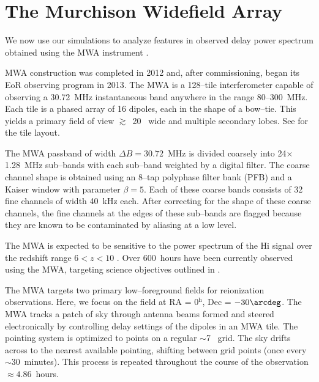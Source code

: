 \documentclass[preprint2,iop,numberedappendix,twocolappendix,appendixfloats]{emulateapj}
\begin{document}
\section{The Murchison Widefield Array}\label{sec:MWA}

We now use our simulations to analyze features in observed delay power spectrum obtained using the MWA instrument \citep{lon09,tin13}.


MWA construction was completed in 2012 and, after commissioning, began its EoR observing program in 2013. The MWA is a 128--tile interferometer capable of observing a 30.72~MHz instantaneous band anywhere in the range 80--300~MHz. Each tile is a phased array of 16 dipoles, each in the shape of a bow--tie. This yields a primary field of view $\gtrsim$~20\arcdeg~ wide and multiple secondary lobes. See \citet{bea12} for the tile layout. %

The MWA passband of width $\Delta B=30.72$~MHz is divided coarsely into 24$\times$1.28~MHz sub--bands with each sub--band weighted by a digital filter. The coarse channel shape is obtained using an 8--tap polyphase filter bank (PFB) and a Kaiser window with parameter $\beta=5$. Each of these coarse bands consists of 32 fine channels of width 40~kHz each. After correcting for the shape of these coarse channels, the fine channels at the edges of these sub--bands are flagged because they are known to be contaminated by aliasing at a low level. %


The MWA is expected to be sensitive to the power spectrum of the H{\sc i} signal over the redshift range $6<z<10$ \citep{bow06,bea13,thy13}. Over 600~hours have been currently observed using the MWA, targeting science objectives outlined in \citet{bow13}.

The MWA targets two primary low--foreground fields for reionization observations. Here, we focus on the field at RA = 0$^\textrm{h}$, Dec = $-30\arcdeg$. The MWA tracks a patch of sky through antenna beams formed and steered electronically by controlling delay settings of the dipoles in an MWA tile. The pointing system is optimized to points on a regular $\sim$7\arcdeg~ grid. The sky drifts across to the nearest available pointing, shifting between grid points (once every $\sim 30$~minutes). This process is repeated throughout the course of the observation $\approx 4.86$~hours. 
\end{document}
